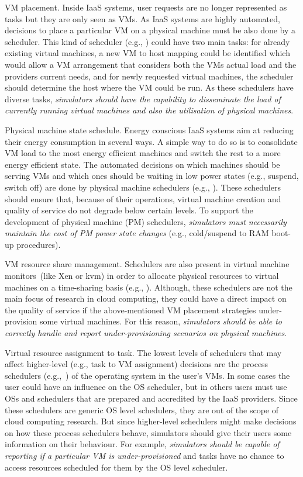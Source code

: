 \documentclass[sort, compress, 5p]{elsarticle}
\begin{document}
\begin{description*}
\item[VM placement.] Inside IaaS systems, user requests are no longer represented as tasks but they are only seen as VMs. As IaaS systems are highly automated, decisions to place a particular VM on a physical machine must be also done by a scheduler. This kind of scheduler (e.g., \cite{tsakalozos2011,6009246}) could have two main tasks:  for already existing virtual machines, a new VM to host mapping could be identified which would allow a VM arrangement that considers both the VMs actual load and the providers current needs, and  for newly requested virtual machines, the scheduler should determine the host where the VM could be run. As these schedulers have diverse tasks, \emph{simulators should have the capability to disseminate the load of currently running virtual machines and also the utilisation of physical machines}.
\item[Physical machine state schedule.] Energy conscious IaaS systems aim at reducing their energy consumption in several ways. A simple way to do so is to consolidate VM load to the most energy efficient machines and switch the rest to a more energy efficient state. The automated decisions on which machines should be serving VMs and which ones should be waiting in low power states (e.g., suspend, switch off) are done by physical machine schedulers (e.g., \cite{5958802,6253507,Wang20131661}). These schedulers should ensure that, because of their operations, virtual machine creation and quality of service do not degrade below certain levels. To support the development of physical machine (PM) schedulers, \emph{simulators must necessarily maintain the cost of PM power state changes} (e.g., cold/suspend to RAM boot-up procedures).
\item[VM resource share management.] Schedulers are also present in virtual machine monitors~(like Xen or kvm) in order to allocate physical resources to virtual machines on a time-sharing basis (e.g., \cite{Ongaro:2008:SIV:1346256.1346258,5289182}). Although, these schedulers are not the main focus of research in cloud computing, they could have a direct impact on the quality of service if the above-mentioned VM placement strategies under-provision some virtual machines. For this reason, \emph{simulators should be able to correctly handle and report under-provisioning scenarios on physical machines}.
\item[Virtual resource assignment to task.] The lowest levels of schedulers that may affect higher-level (e.g., task to VM assignment) decisions are the process schedulers (e.g.,~\cite{Wong:2008:TAF:1400097.1400102, 4510751}) of the operating system in the user's VMs. In some cases the user could have an influence on the OS scheduler, but in others users must use OSs and schedulers that are prepared and accredited by the IaaS providers. Since these schedulers are generic OS level schedulers, they are out of the scope of cloud computing research. But since higher-level schedulers might make decisions on how these process schedulers behave, simulators should give their users some information on their behaviour. For example, \emph{simulators should be capable of reporting if a particular VM is under-provisioned} and tasks have no chance to access resources scheduled for them by the OS level scheduler.

\end{description*}
\end{document}

